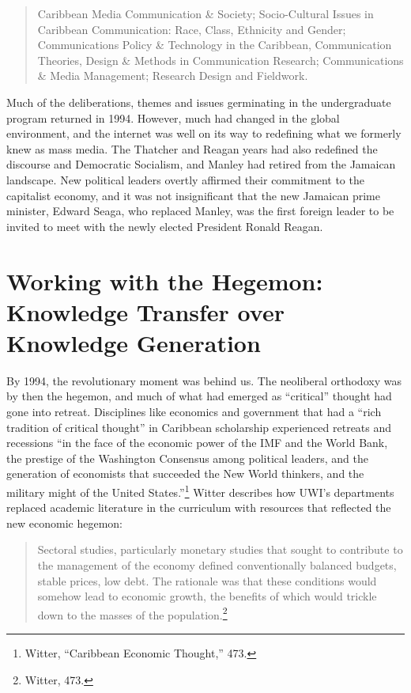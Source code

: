 \documentclass{tufte-handout}
\begin{document}
\begin{quote}
Caribbean Media Communication \& Society; Socio-Cultural Issues in
Caribbean Communication: Race, Class, Ethnicity and Gender;
Communications Policy \& Technology in the Caribbean, Communication
Theories, Design \& Methods in Communication Research; Communications \&
Media Management; Research Design and Fieldwork.
\end{quote}

\noindent Much of the deliberations, themes and issues germinating in the
undergraduate program returned in 1994. However, much had changed in the
global environment, and the internet was well on its way to redefining
what we formerly knew as mass media. The Thatcher and Reagan years had
also redefined the discourse and Democratic Socialism, and Manley had
retired from the Jamaican landscape. New political leaders overtly
affirmed their commitment to the capitalist economy, and it was not
insignificant that the new Jamaican prime minister, Edward Seaga, who
replaced Manley, was the first foreign leader to be invited to meet with
the newly elected President Ronald Reagan.

\hypertarget{working-with-the-hegemon-knowledge-transfer-over-knowledge-generation}{%
\section{Working with the Hegemon: Knowledge Transfer over Knowledge
Generation}\label{working-with-the-hegemon-knowledge-transfer-over-knowledge-generation}}

By 1994, the revolutionary moment was behind us. The neoliberal
orthodoxy was by then the hegemon, and much of what had emerged as
``critical'' thought had gone into retreat. Disciplines like economics
and government that had a ``rich tradition of critical thought'' in
Caribbean scholarship experienced retreats and recessions ``in the face
of the economic power of the IMF and the World Bank, the prestige of the
Washington Consensus among political leaders, and the generation of
economists that succeeded the New World thinkers, and the military might
of the United States.''\footnote{Witter, ``Caribbean Economic Thought,''
  473.} Witter describes how UWI's departments replaced academic
literature in the curriculum with resources that reflected the new
economic hegemon:

\begin{quote}
Sectoral studies, particularly monetary studies that sought to
contribute to the management of the economy defined conventionally
balanced budgets, stable prices, low debt. The rationale was that these
conditions would somehow lead to economic growth, the benefits of which
would trickle down to the masses of the population.\footnote{Witter,
  473.}
\end{quote}
\end{document}

